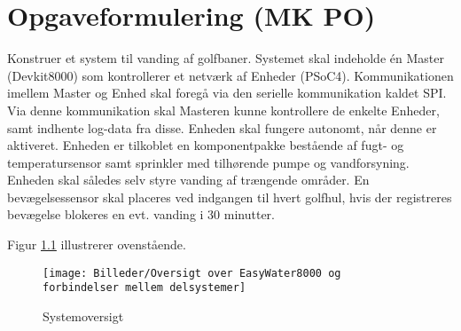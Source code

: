\chapter{Opgaveformulering (MK PO)}

Konstruer et system til vanding af golfbaner. Systemet skal indeholde én Master (Devkit8000) som kontrollerer et netværk af Enheder (PSoC4). Kommunikationen imellem Master og Enhed skal foregå via den serielle kommunikation kaldet SPI. Via denne kommunikation skal Masteren kunne kontrollere de enkelte Enheder, samt indhente log-data fra disse. 
Enheden skal fungere autonomt, når denne er aktiveret. Enheden  er tilkoblet en komponentpakke bestående af fugt- og temperatursensor samt sprinkler med tilhørende pumpe og vandforsyning. Enheden skal således selv styre vanding af trængende områder. En bevægelsessensor skal placeres ved indgangen til hvert golfhul, hvis der registreres bevægelse blokeres en evt. vanding i 30 minutter.  

Figur \ref{fig:systemoversigt} illustrerer ovenstående.  

\begin{figure}[h]
  \centering
    \texttt{[image: Billeder/Oversigt over EasyWater8000 og forbindelser mellem delsystemer]}
    \caption{Systemoversigt}
    \label{fig:systemoversigt}
\end{figure}
